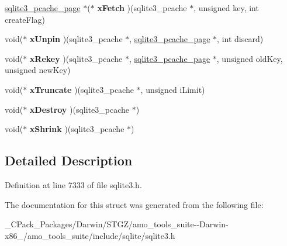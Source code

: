 \begin{DoxyCompactItemize}
\hyperlink{structsqlite3__pcache__page}{sqlite3\+\_\+pcache\+\_\+page} $\ast$($\ast$ {\bfseries x\+Fetch} )(sqlite3\+\_\+pcache $\ast$, unsigned key, int create\+Flag)
\item 
\mbox{\label{structsqlite3__pcache__methods2_ac94294551eda282f17b1ed2a110e1850}} 
void($\ast$ {\bfseries x\+Unpin} )(sqlite3\+\_\+pcache $\ast$, \hyperlink{structsqlite3__pcache__page}{sqlite3\+\_\+pcache\+\_\+page} $\ast$, int discard)
\item 
\mbox{\label{structsqlite3__pcache__methods2_a28a22927b108182e22025bbe6ba1f68e}} 
void($\ast$ {\bfseries x\+Rekey} )(sqlite3\+\_\+pcache $\ast$, \hyperlink{structsqlite3__pcache__page}{sqlite3\+\_\+pcache\+\_\+page} $\ast$, unsigned old\+Key, unsigned new\+Key)
\item 
\mbox{\label{structsqlite3__pcache__methods2_a7c565709ab91dbe7feb5b82c684ba604}} 
void($\ast$ {\bfseries x\+Truncate} )(sqlite3\+\_\+pcache $\ast$, unsigned i\+Limit)
\item 
\mbox{\label{structsqlite3__pcache__methods2_a144d6e899889e80e00f93fb6c83359e2}} 
void($\ast$ {\bfseries x\+Destroy} )(sqlite3\+\_\+pcache $\ast$)
\item 
\mbox{\label{structsqlite3__pcache__methods2_af00c121e9c39b1df292711013c226ba5}} 
void($\ast$ {\bfseries x\+Shrink} )(sqlite3\+\_\+pcache $\ast$)
\end{DoxyCompactItemize}


\subsection{Detailed Description}


Definition at line 7333 of file sqlite3.\+h.



The documentation for this struct was generated from the following file\+:\begin{DoxyCompactItemize}
\item 
\+\_\+\+C\+Pack\+\_\+\+Packages/\+Darwin/\+S\+T\+G\+Z/amo\+\_\+tools\+\_\+suite-\/-\/\+Darwin-\/x86\+\_/amo\+\_\+tools\+\_\+suite/include/sqlite/sqlite3.\+h\end{DoxyCompactItemize}
